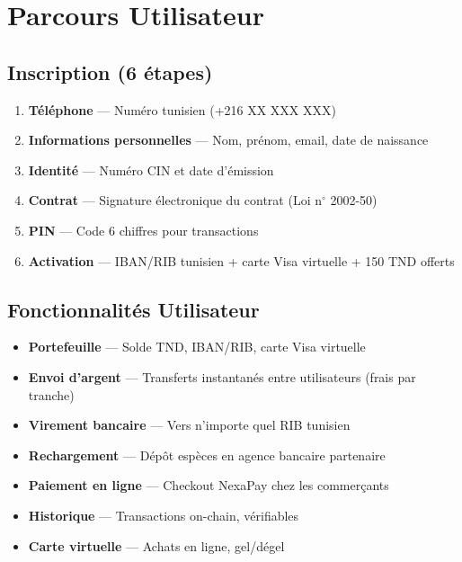 \documentclass[11pt,a4paper]{article}
\begin{document}
\newpage

\section{Parcours Utilisateur}

\subsection{Inscription (6 \'etapes)}

\begin{enumerate}[leftmargin=*]
    \item \textbf{T\'el\'ephone} --- Num\'ero tunisien (+216 XX XXX XXX)
    \item \textbf{Informations personnelles} --- Nom, pr\'enom, email, date de naissance
    \item \textbf{Identit\'e} --- Num\'ero CIN et date d'\'emission
    \item \textbf{Contrat} --- Signature \'electronique du contrat (Loi n$^\circ$ 2002-50)
    \item \textbf{PIN} --- Code 6 chiffres pour transactions
    \item \textbf{Activation} --- IBAN/RIB tunisien + carte Visa virtuelle + 150 TND offerts
\end{enumerate}

\subsection{Fonctionnalit\'es Utilisateur}

\begin{itemize}[leftmargin=*]
    \item \textbf{Portefeuille} --- Solde TND, IBAN/RIB, carte Visa virtuelle
    \item \textbf{Envoi d'argent} --- Transferts instantan\'es entre utilisateurs (frais par tranche)
    \item \textbf{Virement bancaire} --- Vers n'importe quel RIB tunisien
    \item \textbf{Rechargement} --- D\'ep\^ot esp\`eces en agence bancaire partenaire
    \item \textbf{Paiement en ligne} --- Checkout NexaPay chez les commer\c{c}ants
    \item \textbf{Historique} --- Transactions on-chain, v\'erifiables
    \item \textbf{Carte virtuelle} --- Achats en ligne, gel/d\'egel
\end{itemize}
\end{document}

